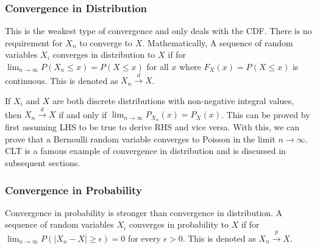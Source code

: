 \documentclass[../probability-notes.tex]{subfiles}
\begin{document}
    \begin{center}
    \end{center}

    \subsubsection{Convergence in Distribution}
    This is the weakest type of convergence and only deals with the CDF. There is no requirement for $X_{n}$ to converge to $X$. Mathematically, A sequence of random variables $X_{i}$ converges in distribution to $X$ if for $\lim_{n \to \infty} P(X_{n} \leq x) = P(X \leq x)$ for all $x$ where $F_{X}(x) = P(X \leq x)$ is continuous. This is denoted as $X_{n} \overset{d}\rightarrow X$.\newline

    If $X_{i}$ and $X$ are both discrete distributions with non-negative integral values, then $X_{n} \overset{d}\rightarrow X$ if and only if $\lim_{n \to \infty} P_{X_{n}}(x) = P_{X}(x)$. This can be proved by first assuming LHS to be true to derive RHS and vice versa. With this, we can prove that a Bernoulli random variable converges to Poisson in the limit $n \to \infty$. CLT is a famous example of convergence in distribution and is discussed in subsequent sections.

    \subsubsection{Convergence in Probability}
    Convergence in probability is stronger than convergence in distribution. A sequence of random variables $X_{i}$ converges in probability to $X$ if for $\lim_{n \to \infty} P(\lvert X_{n} - X \rvert \geq \epsilon) = 0$ for every $\epsilon > 0$. This is denoted as $X_{n} \overset{p}\rightarrow X$.\newline
\end{document}
